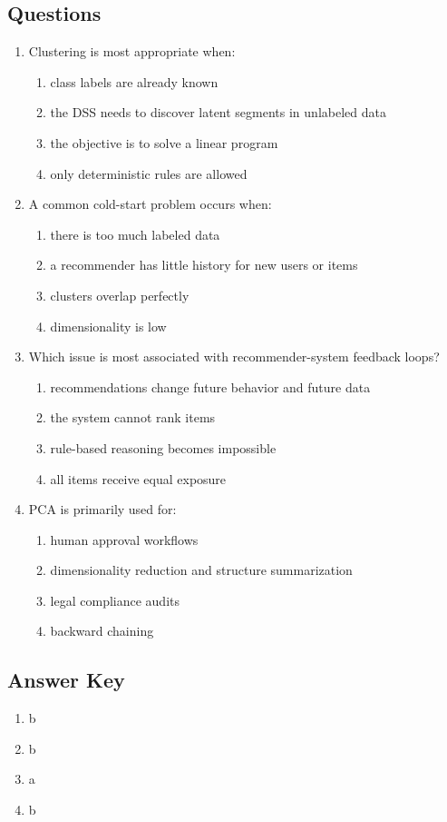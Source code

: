 \subsection*{Questions}
\begin{enumerate}[label=\textbf{Q\arabic*.}]
  \item Clustering is most appropriate when:
  \begin{enumerate}[label=\alph*)]
    \item class labels are already known
    \item the DSS needs to discover latent segments in unlabeled data
    \item the objective is to solve a linear program
    \item only deterministic rules are allowed
  \end{enumerate}

  \item A common cold-start problem occurs when:
  \begin{enumerate}[label=\alph*)]
    \item there is too much labeled data
    \item a recommender has little history for new users or items
    \item clusters overlap perfectly
    \item dimensionality is low
  \end{enumerate}

  \item Which issue is most associated with recommender-system feedback loops?
  \begin{enumerate}[label=\alph*)]
    \item recommendations change future behavior and future data
    \item the system cannot rank items
    \item rule-based reasoning becomes impossible
    \item all items receive equal exposure
  \end{enumerate}

  \item PCA is primarily used for:
  \begin{enumerate}[label=\alph*)]
    \item human approval workflows
    \item dimensionality reduction and structure summarization
    \item legal compliance audits
    \item backward chaining
  \end{enumerate}
\end{enumerate}

\subsection*{Answer Key}
\begin{enumerate}[label=\textbf{Q\arabic*.}]
  \item b
  \item b
  \item a
  \item b
\end{enumerate}
